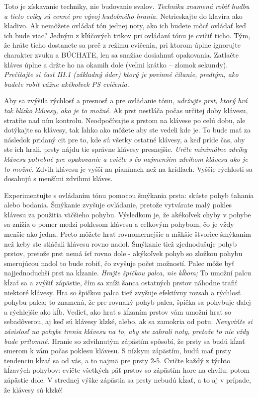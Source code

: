 Toto je získavanie techniky, nie budovanie svalov. \emph{Technika znamená robiť hudbu a tieto cviky sú cenné pre vývoj hudobného hrania.} Netrieskajte do klavíra ako kladivo. Ak nemôžete ovládať tón jednej noty, ako ich budete môcť ovládať keď ich bude viac? Jedným z kľúčových trikov pri ovládaní tónu je cvičiť ticho. Tým, že hráte ticho dostanete sa preč z režimu cvičenia, pri ktorom úplne ignorujte charakter zvuku a BÚCHATE, len sa snažiac dosiahnuť opakovania. Zatlačte kláves úplne a držte ho na okamih dole (veľmi krátko – zlomok sekundy). \emph{Prečítajte si časť III.1 (základný úder) ktorý je povinné čítanie, predtým, ako budete robiť vážne akékoľvek PS cvičenia.}

Aby sa zvýšila rýchlosť a presnosť a pre ovládanie tónu, \emph{udržujte prst, ktorý hrá tak blízko klávesy, ako je to možné.} Ak prst nestláča počas určitej doby klávesu, stratíte nad ním kontrolu. Neodpočívajte s prstom na klávese po celú dobu, ale dotýkajte sa klávesy, tak ľahko ako môžete aby ste vedeli kde je. To bude mať za následok pridaný cit pre to, kde sú všetky ostatné klávesy, a keď príde čas, aby ste ich hrali, prsty nájdu tie správne klávesy presnejšie. \emph{Určte minimálne zdvihy klávesu potrebné pre opakovanie a cvičte s čo najmenším zdvihom klávesu ako je to možné.} Zdvih klávesu je vyšší na pianínach než na krídlach. Vyššie rýchlosti sa dosahujú s menšími zdvihmi kláves.

Experimentujte s ovládaním tónu pomocou šmýkania prsta: skúste pohyb ťahania alebo bodania. Šmýkanie zvyšuje ovládanie, pretože vytvárate malý pokles klávesu za použitia väčšieho pohybu. Výsledkom je, že akékoľvek chyby v pohybe sa znížia o pomer medzi poklesom klávesu a celkovým pohybom, čo je vždy menšie ako jedna. Preto môžete hrať rovnomernejšie a mäkšie štvorice šmýkaním než keby ste stláčali klávesu rovno nadol. Šmýkanie tiež zjednodušuje pohyb prstov, pretože prst nemá ísť rovno dole - akýkoľvek pohyb so zložkou pohybu smerujúcou nadol to bude robiť, čo zvyšuje počet možností. Palec môže byť najjednoduchší prst na kĺzanie. \emph{Hrajte špičkou palca, nie kĺbom;} To umožní palcu kĺzať sa a zvýšiť zápästie, čím sa zníži šanca ostatných prstov náhodne trafiť niektoré klávesy. Hra so špičkou palca tiež zvyšuje efektívny rozsah a rýchlosť pohybu palca; to znamená, že pre rovnaký pohyb palca, špička sa pohybuje ďalej a rýchlejšie ako kĺb. Vedieť, ako hrať s kĺzaním prstov vám umožní hrať so sebadôverou, aj keď sú klávesy klzké, alebo, ak sa zamokria od potu. \emph{Nevyviňte si závislosť na pohybe trenia klávesu na to,  aby ste zahrali noty, pretože to nie vždy bude prítomné.} Hranie so zdvihnutým zápästím spôsobí, že prsty sa budú kĺzať smerom k vám počas poklesu klávesu. S nízkym zápästím, budú mať prsty tendenciu kĺzať sa od vás, a to najmä pre prsty 2-5. Cvičte každý z týchto kĺzavých pohybov: cvičte všetkých päť prstov so zápästím hore na chvíľu; potom zápästie dole. V strednej výške zápästia sa prsty nebudú kĺzať, a to aj v prípade, že klávesy sú klzké!

